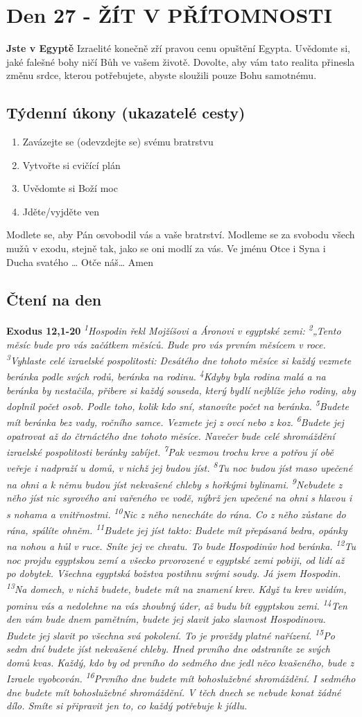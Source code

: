 \documentclass[11pt]{article}
\newcommand{\zacatekCtvrtyTyden}{
  \textbf{Jste v Egyptě} \newline
  Izraelité konečně zří pravou cenu opuštění Egypta. Uvědomte si, jaké falešné bohy ničí Bůh ve vašem životě.
Dovolte, aby vám tato realita přinesla změnu srdce, kterou potřebujete, abyste sloužili pouze Bohu samotnému.

\subsection*{Týdenní úkony (ukazatelé cesty)}
\begin{enumerate}
  \item Zavázejte se (odevzdejte se) svému bratrstvu
  \item Vytvořte si cvičící plán
  \item Uvědomte si Boží moc
  \item Jděte/vyjděte ven
\end{enumerate}
Modlete se, aby Pán osvobodil vás a vaše bratrství. \newline
Modleme se za svobodu všech mužů v exodu, stejně tak, jako se oni modlí za vás.\newline
Ve jménu Otce i Syna i Ducha svatého …  Otče náš… Amen
}
\begin{document}
\newpage
\section{Den 27 - ŽÍT V PŘÍTOMNOSTI}
\zacatekCtvrtyTyden
\subsection*{Čtení na den}
\textbf{Exodus 12,1-20}
\newline
\textit{
\textsuperscript{1}Hospodin řekl Mojžíšovi a Áronovi v egyptské zemi:
\textsuperscript{2}„Tento měsíc bude pro vás začátkem měsíců. Bude pro vás prvním měsícem v roce.
\textsuperscript{3}Vyhlaste celé izraelské pospolitosti: Desátého dne tohoto měsíce si každý vezmete beránka podle svých rodů, beránka na rodinu.
\textsuperscript{4}Kdyby byla rodina malá a na beránka by nestačila, přibere si každý souseda, který bydlí nejblíže jeho rodiny, aby doplnil počet osob. Podle toho, kolik kdo sní, stanovíte počet na beránka.
\textsuperscript{5}Budete mít beránka bez vady, ročního samce. Vezmete jej z ovcí nebo z koz.
\textsuperscript{6}Budete jej opatrovat až do čtrnáctého dne tohoto měsíce. Navečer bude celé shromáždění izraelské pospolitosti beránky zabíjet.
\textsuperscript{7}Pak vezmou trochu krve a potřou jí obě veřeje i nadpraží u domů, v nichž jej budou jíst.
\textsuperscript{8}Tu noc budou jíst maso upečené na ohni a k němu budou jíst nekvašené chleby s hořkými bylinami.
\textsuperscript{9}Nebudete z něho jíst nic syrového ani vařeného ve vodě, nýbrž jen upečené na ohni s hlavou i s nohama a vnitřnostmi.
\textsuperscript{10}Nic z něho nenecháte do rána. Co z něho zůstane do rána, spálíte ohněm.
\textsuperscript{11}Budete jej jíst takto: Budete mít přepásaná bedra, opánky na nohou a hůl v ruce. Sníte jej ve chvatu. To bude Hospodinův hod beránka.
\textsuperscript{12}Tu noc projdu egyptskou zemí a všecko prvorozené v egyptské zemi pobiji, od lidí až po dobytek. Všechna egyptská božstva postihnu svými soudy. Já jsem Hospodin.
\textsuperscript{13}Na domech, v nichž budete, budete mít na znamení krev. Když tu krev uvidím, pominu vás a nedolehne na vás zhoubný úder, až budu bít egyptskou zemi.
\textsuperscript{14}Ten den vám bude dnem pamětním, budete jej slavit jako slavnost Hospodinovu. Budete jej slavit po všechna svá pokolení. To je provždy platné nařízení.
\textsuperscript{15}Po sedm dní budete jíst nekvašené chleby. Hned prvního dne odstraníte ze svých domů kvas. Každý, kdo by od prvního do sedmého dne jedl něco kvašeného, bude z Izraele vyobcován.
\textsuperscript{16}Prvního dne budete mít bohoslužebné shromáždění. I sedmého dne budete mít bohoslužebné shromáždění. V těch dnech se nebude konat žádné dílo. Smíte si připravit jen to, co každý potřebuje k jídlu.
}
\end{document}
